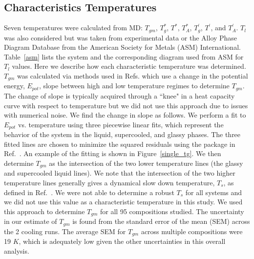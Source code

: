 \documentclass[11pt,a4paper]{article}                                %
\begin{document}
\subsection{Characteristics Temperatures}\label{cts}

\par
Seven temperatures were calculated from MD: $T_{gm}$, $T_{g}^{*}$, $T^{*}$, $T_{A}^{*}$, $T_{g}^{'}$, $T^{'}$, and $T_{A}^{'}$. $T_{l}$ was also considered but was taken from experimental data or the Alloy Phase Diagram Database from the American Society for Metals (ASM) International. Table~\ref{asm} lists the system and the corresponding diagram used from ASM for $T_{l}$ values. Here we describe how each characteristic temperature was determined. $T_{gm}$ was calculated via methods used in Refs. \cite{Cheng2008_2, Sheng2012} which use a change in the potential energy, $E_{pot}$, slope between high and low temperature regimes to determine $T_{gm}$. The change of slope is typically acquired through a ``knee" in a heat capacity curve with respect to temperature but we did not use this approach due to issues with numerical noise. We find the change in slope as follows. We perform a fit to $E_{pot}$ vs. temperature using three piecewise linear fits, which represent the behavior of the system in the liquid, supercooled, and glassy phases. The three fitted lines are chosen to minimize the squared residuals using the package in Ref.~\cite{pwlf}. An example of the fitting is shown in Figure~\ref{single_tg}. We then determine $T_{gm}$ as the intersection of the two lower temperature lines (the glassy and supercooled liquid lines). We note that the intersection of the two higher temperature lines generally gives a dynamical slow down temperature, $T_{s}$, as defined in Ref.~\cite{Sheng2012}. We were not able to determine a robust $T_{s}$ for all systems and we did not use this value as a characteristic temperature in this study. We used this approach to determine $T_{gm}$ for all 95 compositions studied. The uncertainty in our estimate of $T_{gm}$ is found from the standard error of the mean (SEM) across the 2 cooling runs. The average SEM for $T_{gm}$ across multiple compositions were 19 $K$, which is adequately low given the other uncertainties in this overall analysis.
\end{document}
